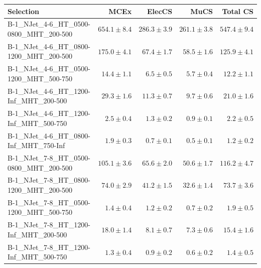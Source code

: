 \documentclass{beamer}
\begin{document}
\begin{frame}
\tiny
\begin{tabular}{lrrrr}
\toprule

                                                Selection  &          MCEx  &         ElecCS  &                     MuCS  &          Total CS  \\ 
\midrule
      B-1\_NJet\_4-6\_HT\_0500-0800\_MHT\_200-500 &             $654.1\pm8.4$&            $286.3\pm3.9$&            $261.1\pm3.8$&                 $547.4\pm9.4$ \\ 
      B-1\_NJet\_4-6\_HT\_0800-1200\_MHT\_200-500 &             $175.0\pm4.1$&             $67.4\pm1.7$&             $58.5\pm1.6$&                 $125.9\pm4.1$ \\ 
      B-1\_NJet\_4-6\_HT\_0500-1200\_MHT\_500-750 &              $14.4\pm1.1$&              $6.5\pm0.5$&              $5.7\pm0.4$&                  $12.2\pm1.1$ \\ 
       B-1\_NJet\_4-6\_HT\_1200-Inf\_MHT\_200-500 &              $29.3\pm1.6$&             $11.3\pm0.7$&              $9.7\pm0.6$&                  $21.0\pm1.6$ \\ 
       B-1\_NJet\_4-6\_HT\_1200-Inf\_MHT\_500-750 &               $2.5\pm0.4$&              $1.3\pm0.2$&              $0.9\pm0.1$&                   $2.2\pm0.5$ \\ 
       B-1\_NJet\_4-6\_HT\_0800-Inf\_MHT\_750-Inf &               $1.9\pm0.3$&              $0.7\pm0.1$&              $0.5\pm0.1$&                   $1.2\pm0.2$ \\ 
      B-1\_NJet\_7-8\_HT\_0500-0800\_MHT\_200-500 &             $105.1\pm3.6$&             $65.6\pm2.0$&             $50.6\pm1.7$&                 $116.2\pm4.7$ \\ 
      B-1\_NJet\_7-8\_HT\_0800-1200\_MHT\_200-500 &              $74.0\pm2.9$&             $41.2\pm1.5$&             $32.6\pm1.4$&                  $73.7\pm3.6$ \\ 
      B-1\_NJet\_7-8\_HT\_0500-1200\_MHT\_500-750 &               $1.4\pm0.4$&              $1.2\pm0.2$&              $0.7\pm0.2$&                   $1.9\pm0.5$ \\ 
       B-1\_NJet\_7-8\_HT\_1200-Inf\_MHT\_200-500 &              $18.0\pm1.4$&              $8.1\pm0.7$&              $7.3\pm0.6$&                  $15.4\pm1.6$ \\ 
       B-1\_NJet\_7-8\_HT\_1200-Inf\_MHT\_500-750 &               $1.3\pm0.4$&              $0.9\pm0.2$&              $0.6\pm0.2$&                   $1.4\pm0.5$ \\ 

\end{tabular}
\end{frame}
\end{document}
